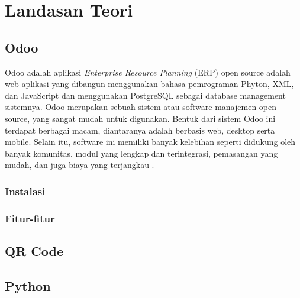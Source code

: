 \chapter{Landasan Teori}
\label{sec:landasanteori}

\section{Odoo}
\label{sec:odoo}

Odoo adalah aplikasi \textit{Enterprise Resource Planning} (ERP) open source adalah web aplikasi yang dibangun menggunakan bahasa pemrograman Phyton, XML, dan JavaScript dan menggunakan PostgreSQL sebagai database management sistemnya.  Odoo merupakan sebuah sistem atau software manajemen open source, yang sangat mudah untuk digunakan. Bentuk dari sistem Odoo ini terdapat berbagai macam, diantaranya adalah berbasis web, desktop serta mobile. Selain itu, software ini memiliki banyak kelebihan seperti didukung oleh banyak komunitas, modul yang lengkap dan terintegrasi, pemasangan yang mudah, dan juga biaya yang terjangkau \cite{suminten2019implementasi}.


\subsection{Instalasi}
\label{sec:instalasi}

\subsection{Fitur-fitur}
\label{sec:fitur}

\section{QR Code}
\label{sec:qr}

\section{Python}
\label{sec:python}